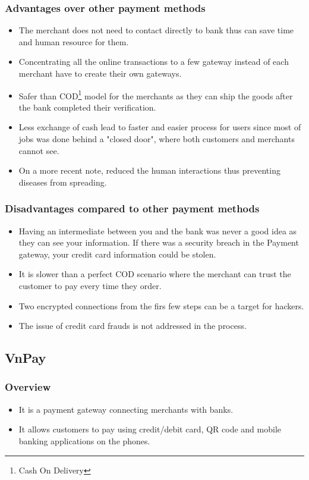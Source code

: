 \documentclass[12pt,a4paper]{article}
\begin{document}
	\subsubsection{Advantages over other payment methods}
	\begin{itemize}
		\item The merchant does not need to contact directly to bank thus can save time and human resource for them.
		\item Concentrating all the online transactions to a few gateway instead of each merchant have to create their own gateways.
		\item Safer than COD\footnote{Cash On Delivery} model for the merchants as they can ship the goods after the bank completed their verification.
		\item Less exchange of cash lead to faster and easier process for users since most of jobs was done behind a "closed door", where both customers and merchants cannot see.
		\item On a more recent note, reduced the human interactions thus preventing diseases from spreading.
	\end{itemize}
	\subsubsection{Disadvantages compared to other payment methods}
	\begin{itemize}
		\item Having an intermediate between you and the bank was never a good idea as they can see your information. If there was a security breach in the Payment gateway, your credit card information could be stolen.
		\item It is slower than a perfect COD scenario where the merchant can trust the customer to pay every time they order.
		\item Two encrypted connections from the firs few steps can be a target for hackers.
		\item The issue of credit card frauds is not addressed in the process. 
	\end{itemize}
\subsection{VnPay}
	\subsubsection{Overview}
	\begin{itemize}
		\item It is a payment gateway connecting merchants with banks.
		\item It allows customers to pay using credit/debit card, QR code and mobile banking applications on the phones.
	\end{itemize}
\end{document}
